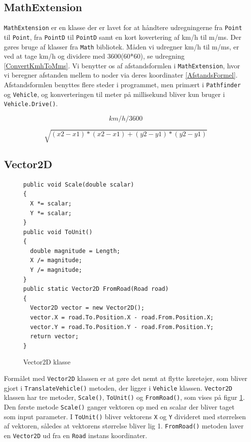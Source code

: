 \subsection{MathExtension}
\texttt{MathExtension} er en klasse der er lavet for at håndtere udregningerne fra \texttt{Point} til \texttt{Point}, fra \texttt{PointD} til \texttt{PointD} samt en kort kovertering af km/h til m/ms. Der gøres bruge af klasser fra \texttt{Math} bibliotek. Måden vi udregner km/h til m/ms, er ved at tage km/h og dividere med 3600(60*60), se udregning \ref{ConvertKmhToMms}. Vi benytter os af afstandsformlen i \texttt{MathExtension}, hvor vi beregner afstanden mellem to noder via deres koordinater \ref{AfstandsFormel}. Afstandsformlen benyttes flere steder i programmet, men primært i \texttt{Pathfinder} og \texttt{Vehicle}, og konverteringen til meter på millisekund bliver kun bruger i \texttt{Vehicle.Drive()}.

\begin{equation} \label{ConvertKmhToMms}
km/h / 3600
\end{equation}

\begin{equation} \label{AfstandsFormel}
\sqrt{(x2 - x1) * (x2 - x1) + (y2 - y1) * (y2 - y1)}
\end{equation}

\subsection{Vector2D}
\begin{figure}[H]
\begin{lstlisting}
public void Scale(double scalar)
{
  X *= scalar;
  Y *= scalar;
}
public void ToUnit()
{
  double magnitude = Length;
  X /= magnitude;
  Y /= magnitude;
}
public static Vector2D FromRoad(Road road)
{
  Vector2D vector = new Vector2D();
  vector.X = road.To.Position.X - road.From.Position.X;
  vector.Y = road.To.Position.Y - road.From.Position.Y;
  return vector;
}
\end{lstlisting}
\caption{Vector2D klasse}\label{Vector2D}
\end{figure}

Formålet med \texttt{Vector2D} klassen er at gøre det nemt at flytte køretøjer, som bliver gjort i \texttt{TranslateVehicle()} metoden, der ligger i \texttt{Vehicle} klassen. \texttt{Vector2D} klassen har tre metoder, \texttt{Scale()}, \texttt{ToUnit()} og \texttt{FromRoad()}, som vises på figur \ref{Vector2D}. Den første metode \texttt{Scale()} ganger vektoren op med en scalar der bliver taget som input parameter. I \texttt{ToUnit()} bliver vektorens \texttt{X} og \texttt{Y} divideret med størrelsen af vektoren, således at vektorens størrelse bliver lig 1. \texttt{FromRoad()} metoden laver en \texttt{Vector2D} ud fra en \texttt{Road} instans koordinater.
